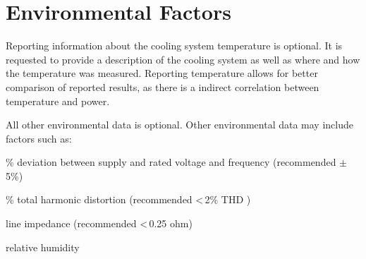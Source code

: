 \section{Environmental Factors}
\label{sec:EF}
\noindent
Reporting information about the cooling system temperature is optional.
It is requested to provide a description of the cooling system as well as where and how the temperature was measured.
Reporting temperature allows for better comparison of reported results, as there is a indirect correlation between temperature and power.

\wl

\noindent
All other environmental data is optional.
Other environmental data may include factors such as:

\begin{packed_item}
\item[{-}]
\% deviation between supply and rated voltage and frequency (recommended $\pm$\,5\%)
\item[{-}]
\% total harmonic distortion (recommended \textless\,2\% THD )
\item[{-}]
line impedance (recommended \textless\,0.25 ohm)
\item[{-}]
relative humidity
\end{packed_item}

